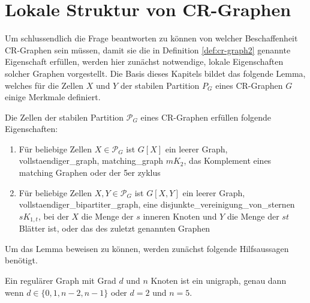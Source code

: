 \section{Lokale Struktur von CR-Graphen}
\label{sec/struktur_lokal}


Um schlussendlich die Frage beantworten zu können von welcher Beschaffenheit CR-Graphen sein müssen, damit sie die in Definition \ref{def:cr-graph2} genannte Eigenschaft erfüllen, werden hier zunächst notwendige, lokale Eigenschaften solcher Graphen vorgestellt.
Die Basis dieses Kapitels bildet das folgende Lemma, welches für die Zellen $X$ und $Y$ der stabilen Partition $P_G$ eines CR-Graphen $G$ einige Merkmale definiert.

\begin{Lemma}
	Die Zellen der stabilen Partition $\mathcal{P}_G$ eines CR-Graphen erfüllen folgende Eigenschaften:
	
	\begin{enumerate}[label=(\Alph*)]
		\item Für beliebige Zellen $X\in \mathcal{P}_G$ ist $G[X]$ ein leerer Graph, \gls{vollstaendiger_graph}, \gls{matching_graph} $mK_2$, das Komplement eines matching Graphen oder der 5er \gls{zyklus}
		\item Für beliebige Zellen $X,Y\in \mathcal{P}_G$ ist $G[X,Y]$ ein leerer Graph, \gls{vollstaendiger_bipartiter_graph}, eine \gls{disjunkte_vereinigung_von_sternen} $sK_{1,t}$, bei der $X$ die Menge der $s$ inneren Knoten und $Y$ die Menge der $st$ Blätter ist, oder das  des zuletzt genannten Graphen
	\end{enumerate}
	\label{lemma:lokal}
\end{Lemma}

Um das Lemma beweisen zu können, werden zunächst folgende Hilfsaussagen benötigt.

\begin{Lemma}
	Ein regulärer Graph mit Grad $d$ und $n$ Knoten ist ein \gls{unigraph}, genau dann wenn $d\in \{0,1,n-2,n-1\}$ oder $d=2$ und $n=5$.
	\label{lemma:lokal_regulaer}
\end{Lemma}

